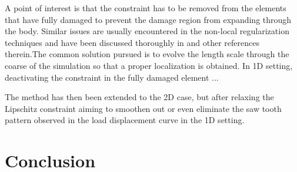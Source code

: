 \documentclass[10pt]{elsarticle}
\begin{document}
A point of interest is that the constraint has to be removed from the elements that have fully damaged to prevent the damage region from expanding through the body. Similar issues are usually encountered in the non-local regularization techniques and have been discussed thoroughly in \cite{Geers1998,Cabot2014,Le2018} and other references therein.The common solution pursued is to evolve the length scale through the coarse of the simulation so that a proper localization is obtained. In 1D setting, deactivating the constraint in the fully damaged element ...

The method has then been extended to the 2D case, but after relaxing the Lipschitz constraint aiming to smoothen out or even eliminate the saw tooth pattern observed in the load displacement curve in the 1D setting.  




\section{Conclusion}



\appendix
\end{document}
